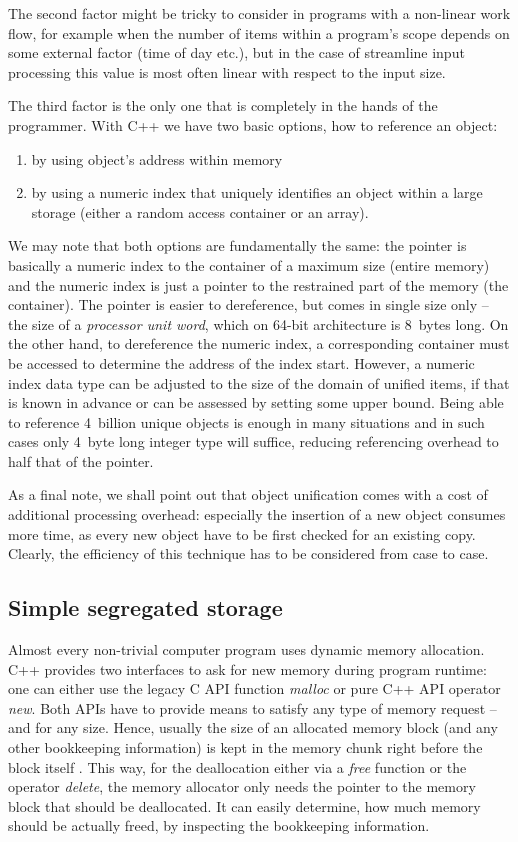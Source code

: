 The second factor might be tricky to consider in programs with a non-linear work flow,
for example when the number of items within a program's scope depends on some external
factor (time of day etc.), but in the case of streamline input processing this value is
most often linear with respect to the input size.

The third factor is the only one that is completely in the hands of the programmer.
With C++ we have two basic options, how to reference an object:
\begin{enumerate}
  \item by using object's address within memory
  \item by using a numeric index that uniquely identifies an object within a large storage
  (either a random access container or an array).
\end{enumerate}

We may note that both options are fundamentally the same:
the pointer is basically a numeric index to the container of a maximum size (entire memory)
and the numeric index is just a pointer to the restrained part of the memory (the container).
The pointer is easier to dereference, but comes in single size only -- the size of
a \emph{processor unit word}, which on 64-bit architecture is 8~bytes long.
On the other hand, to dereference the numeric index, a corresponding container must be
accessed to determine the address of the index start.
However, a numeric index data type can be adjusted to the size of the domain of unified items,
if that is known in advance or can be assessed by setting some upper bound.
Being able to reference 4~billion unique objects is enough in many situations and
in such cases only 4~byte long integer type will suffice, reducing referencing overhead
to half that of the pointer.

As a final note, we shall point out that object unification comes with a cost of
additional processing overhead: especially the insertion of a new object consumes more time,
as every new object have to be first checked for an existing copy.
Clearly, the efficiency of this technique has to be considered from case to case.

\subsection{Simple segregated storage}
\label{sec:simple-segregated-storage}

Almost every non-trivial computer program uses dynamic memory allocation.
C++ provides two interfaces to ask for new memory during program runtime:
one can either use the legacy C API function \emph{malloc} or pure C++ API operator \emph{new}.
Both APIs have to provide means to satisfy any type of memory request -- and for any size.
Hence, usually the size of an allocated memory block (and any other bookkeeping information) is
kept in the memory chunk right before the block itself \citep[Item 10]{meyers:effective-cpp}.
This way, for the deallocation either via a \emph{free} function or the operator \emph{delete},
the memory allocator only needs the pointer to the memory block that should be deallocated.
It can easily determine, how much memory should be actually freed, by inspecting the
bookkeeping information.

